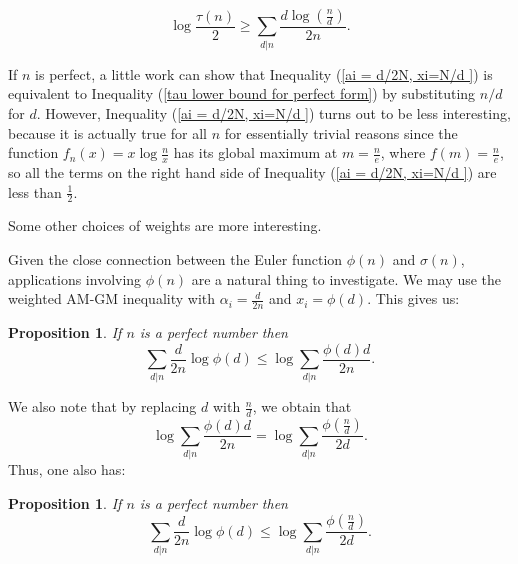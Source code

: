 \documentclass{article}
\newtheorem{proposition}[theorem]{Proposition}
\begin{document}
\begin{equation} \label{ai = d/2N, xi=N/d  } \log \frac{\tau(n)}{2} \geq \sum_{d|n}\frac{d \log \left(\frac{n}{d}\right)}{2n}. 
\end{equation}


%

If $n$ is perfect, a little work can show that Inequality (\ref{ai = d/2N, xi=N/d  }) is equivalent to Inequality (\ref{tau lower bound for perfect form}) by substituting $n/d$ for $d$. However, Inequality  (\ref{ai = d/2N, xi=N/d  }) turns out to be less interesting, because it is actually true for all $n$ for essentially trivial reasons since the function $f_n(x)=x \log \frac{n}{x}$ has its global maximum at $m=\frac{n}{e}$, where $f(m)=\frac{n}{e}$, so all the terms on the right hand side of Inequality (\ref{ai = d/2N, xi=N/d  }) are less than $\frac{1}{2}$.

Some other choices of weights are more interesting.  

Given the close connection between the Euler function $\phi(n)$ and $\sigma(n)$, applications involving $\phi(n)$ are a natural thing to investigate.  We may use the weighted AM-GM inequality with $\alpha_i = \frac{d}{2n}$ and $x_i = \phi(d)$.
This gives us:

\begin{proposition} If $n$ is a perfect number then $$\sum_{d|n} \frac{d}{2n} \log \phi(d) \leq \log \sum_{d|n} \frac{\phi(d)d}{2n}. $$  \label{A < B}  
\end{proposition}

We also note that by replacing $d$ with $\frac{n}{d}$, we obtain that $$\log \sum_{d|n} \frac{\phi(d)d}{2n} =  \log \sum_{d|n} \frac{\phi(\frac{n}{d})}{2d}.$$ Thus, one also has:

\begin{proposition} If $n$ is a perfect number then $$\sum_{d|n} \frac{d}{2n} \log \phi(d) \leq \log \sum_{d|n} \frac{\phi(\frac{n}{d})}{2d}. $$    
\end{proposition}
\end{document}
